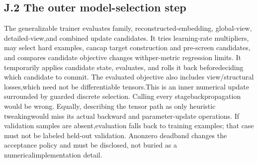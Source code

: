 \subsection*{J.2  The outer model-selection step}
\noindent
The generalizable trainer evaluates family, reconstructed-embedding, global-view, detailed-view,\linebreak[4]
and combined update candidates. It tries learning-rate multipliers, may select hard examples, can\linebreak[4]
cap target construction and pre-screen candidates, and compares candidate objective changes with\linebreak[4]
per-metric regression limits. It temporarily applies candidate state, evaluates, and rolls it back before\linebreak[4]
deciding which candidate to commit. The evaluated objective also includes view/structural losses,\linebreak[4]
which need not be differentiable tensors.\linebreak[4]
This is an inner numerical update surrounded by guarded discrete selection. Calling every stage\linebreak[4]
backpropagation would be wrong. Equally, describing the tensor path as only heuristic tweaking\linebreak[4]
would miss its actual backward and parameter-update operations. If validation samples are absent,\linebreak[4]
evaluation falls back to training examples; that case must not be labeled held-out validation. A\linebreak[4]
nonzero deadband changes the acceptance policy and must be disclosed, not buried as a numerical\linebreak[4]
implementation detail.\par

